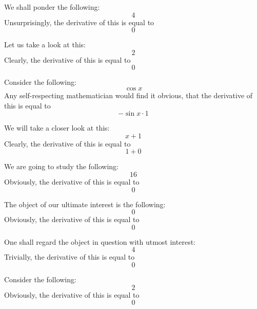 \documentclass{article}
\begin{document}
We shall ponder the following:
\begin{equation}
4 
\end{equation}
Unsurprisingly, the derivative of this is equal to
\begin{equation}
0 
\end{equation}

Let us take a look at this:
\begin{equation}
2 
\end{equation}
Clearly, the derivative of this is equal to
\begin{equation}
0 
\end{equation}

Consider the following:
\begin{equation}
\cos x 
\end{equation}
Any self-respecting mathematician would find it obvious, that the derivative of this is equal to
\begin{equation}
-\sin x \cdot 1 
\end{equation}

We will take a closer look at this:
\begin{equation}
x + 1 
\end{equation}
Clearly, the derivative of this is equal to
\begin{equation}
1 + 0 
\end{equation}

We are going to study the following:
\begin{equation}
16 
\end{equation}
Obviously, the derivative of this is equal to
\begin{equation}
0 
\end{equation}

The object of our ultimate interest is the following:
\begin{equation}
0 
\end{equation}
Obviously, the derivative of this is equal to
\begin{equation}
0 
\end{equation}

One shall regard the object in question with utmost interest:
\begin{equation}
4 
\end{equation}
Trivially, the derivative of this is equal to
\begin{equation}
0 
\end{equation}

Consider the following:
\begin{equation}
2 
\end{equation}
Obviously, the derivative of this is equal to
\begin{equation}
0 
\end{equation}
\end{document}
